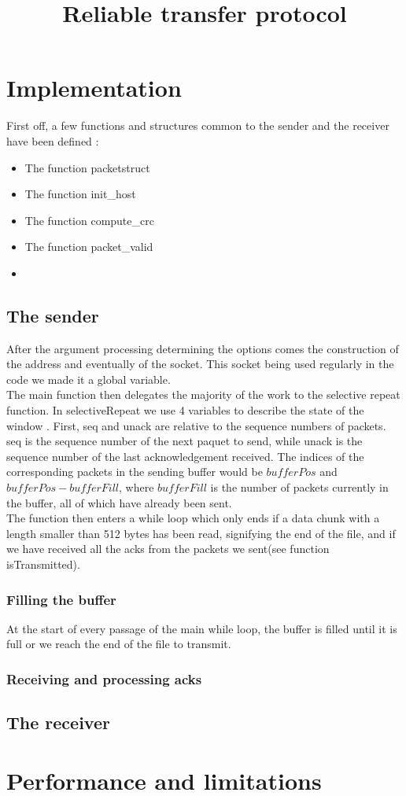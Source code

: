\documentclass[10pt,a4paper]{article}
\title{Reliable transfer protocol}
\begin{document}
\maketitle
\section{Implementation}
First off, a few functions and structures common to the sender and the receiver have been defined : 
\begin{itemize}
\item The function packetstruct
\item The function init\_host
\item The function compute\_crc
\item The function packet\_valid
\item {}
\end{itemize}
\subsection{The sender}
After the argument processing determining the options comes the construction of the address and eventually of the socket. 
This socket being used regularly in the code we made it a global variable.\\
The main function then delegates the majority of the work to the selective repeat function. In selectiveRepeat we use 4 variables to describe the state of the window  . First, seq and unack are relative to the sequence numbers of packets. seq is the sequence number of the next paquet to send, while unack is the sequence number of the last acknowledgement received. The indices of the corresponding packets in the sending buffer would be $bufferPos$ and $bufferPos-bufferFill$, where $bufferFill$ is the number of packets currently in the buffer, all of which have already been sent.\\
The function then enters a while loop which only ends if a data chunk with a length smaller than 512 bytes has been read, signifying the end of the file, and if we have received all the acks from the packets we sent(see function isTransmitted).\\
\subsubsection{Filling the buffer}
At the start of every passage of the main while loop, the buffer is filled until it is full or we reach the end of the file to transmit.

\subsubsection{Receiving and processing acks}
\subsection{The receiver}
\section{Performance and limitations}
\end{document}
